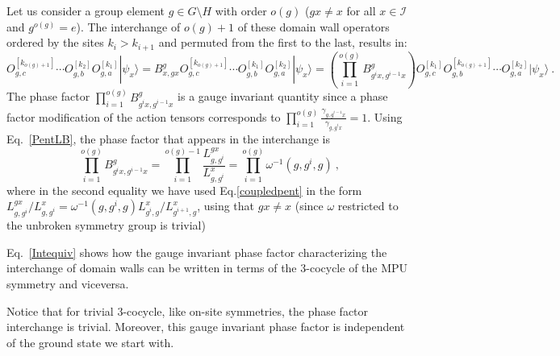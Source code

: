 \documentclass[aps,pra,export,nofootinbib]{revtex4-2}
\begin{document}
Let us consider a group element $g\in G\setminus H $ with order $o(g)$ ($gx \neq x$ for all $x\in \mathcal{I}$ and $g^{o(g)}=e$). The interchange of $o(g)+1$ of these domain wall operators ordered by the sites $k_i > k_{i+1}$ and permuted from the first to the last, results in:
%
$$ O^{[k_{o(g)+1}]}_{g,c}\cdots O^{[k_2]}_{g,b} O^{[k_1]}_{g,a} |\psi_x\rangle =   B^{g}_{x,gx} O^{[k_{o(g)+1}]}_{g,c} \cdots O^{[k_1]}_{g,b} O^{[k_2]}_{g,a}  |\psi_x\rangle = \left (  \prod_{i=1}^{o(g)} B^{g}_{ g^{i}x, {g^{i-1}x}}\right ) O^{[k_1]}_{g,c} O^{[k_{o(g)+1}]}_{g,b}\cdots O^{[k_2]}_{g,a} |\psi_x\rangle \ .$$
%
The phase factor $\prod_{i=1}^{o(g)} B^{g}_{ g^{i}x, {g^{i-1}x}}$ is a gauge invariant quantity since a phase factor modification of the action tensors corresponds to $\prod_{i=1}^{o(g)}\frac{\gamma_{g,g^{i-1}x}} { \gamma_{g, g^{i}x}} = 1$. Using Eq.~\eqref{PentLB}, the phase factor that appears in the interchange is
%
\begin{equation}\label{Intequiv}
 \prod_{i=1}^{o(g)} B^{g}_{ g^{i}x, {g^{i-1}x}}  =  \prod_{i=1}^{o(g)-1} \frac{L^{gx}_{g,g^i}}{L^{x}_{g,g^i }} = \prod_{i=1}^{o(g)} \omega^{-1}(g,g^i,g) \ ,
 \end{equation}
where in the second equality we have used Eq.\eqref{coupledpent} in the form ${L^{gx}_{g,g^i}}/{L^{x}_{g,g^i }} =  \omega^{-1}(g,g^i,g) {L^{x}_{g^i,g}}/{L^{x}_{g^{i+1},g }} $, using that $gx\neq x$ (since $\omega$ restricted to the unbroken symmetry group is trivial)

Eq.\ \eqref{Intequiv} shows how the gauge invariant phase factor characterizing the interchange of domain walls can be written in terms of the $3$-cocycle of the MPU symmetry and viceversa.

Notice that for trivial $3$-cocycle, like on-site symmetries, the phase factor interchange is trivial. Moreover, this gauge invariant phase factor is independent of the ground state we start with. \\ 
\end{document}
